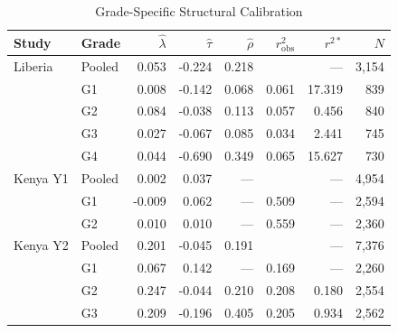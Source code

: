 \begin{table}[htbp]
\centering\small
\caption{Grade-Specific Structural Calibration}
\label{tab:calib_grade}
\begin{tabular}{llrrrrrr}
\toprule
Study & Grade & $\hat{\lambda}$ & $\hat{\tau}$ & $\hat{\rho}$ & $r^2_{\text{obs}}$ & $r^{2*}$ & $N$ \\
\midrule
Liberia & Pooled & 0.053 & -0.224 & 0.218 &  & --- & 3,154 \\
 & G1 & 0.008 & -0.142 & 0.068 & 0.061 & 17.319 & 839 \\
 & G2 & 0.084 & -0.038 & 0.113 & 0.057 & 0.456 & 840 \\
 & G3 & 0.027 & -0.067 & 0.085 & 0.034 & 2.441 & 745 \\
 & G4 & 0.044 & -0.690 & 0.349 & 0.065 & 15.627 & 730 \\
\addlinespace
Kenya Y1 & Pooled & 0.002 & 0.037 & --- &  & --- & 4,954 \\
 & G1 & -0.009 & 0.062 & --- & 0.509 & --- & 2,594 \\
 & G2 & 0.010 & 0.010 & --- & 0.559 & --- & 2,360 \\
\addlinespace
Kenya Y2 & Pooled & 0.201 & -0.045 & 0.191 &  & --- & 7,376 \\
 & G1 & 0.067 & 0.142 & --- & 0.169 & --- & 2,260 \\
 & G2 & 0.247 & -0.044 & 0.210 & 0.208 & 0.180 & 2,554 \\
 & G3 & 0.209 & -0.196 & 0.405 & 0.205 & 0.934 & 2,562 \\
\bottomrule
\end{tabular}
\par\smallskip{}
\end{table}